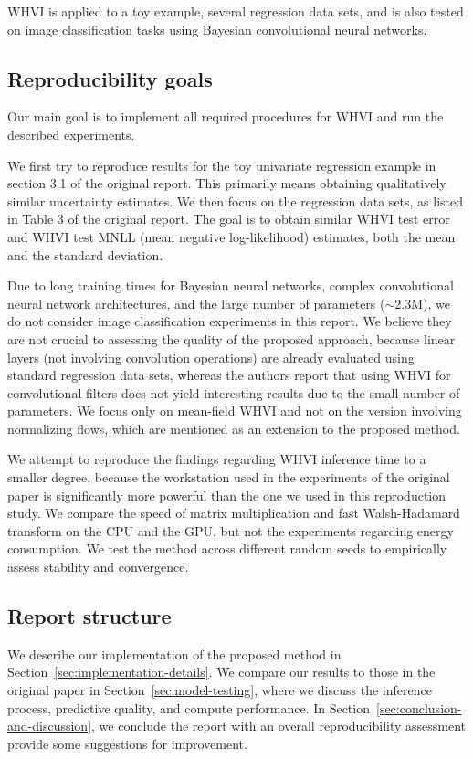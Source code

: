 WHVI is applied to a toy example, several regression data sets, and is also tested on image classification tasks using Bayesian convolutional neural networks.

\subsection{Reproducibility goals}\label{subsec:reproducibility-goals}
Our main goal is to implement all required procedures for WHVI and run the described experiments.

We first try to reproduce results for the toy univariate regression example in section 3.1 of the original report.
This primarily means obtaining qualitatively similar uncertainty estimates.
We then focus on the regression data sets, as listed in Table 3 of the original report.
The goal is to obtain similar WHVI test error and WHVI test MNLL (mean negative log-likelihood) estimates, both the mean and the standard deviation.

Due to long training times for Bayesian neural networks, complex convolutional neural network architectures, and the large number of parameters ($\sim 2.3$M), we do not consider image classification experiments in this report.
We believe they are not crucial to assessing the quality of the proposed approach, because linear layers (not involving convolution operations) are already evaluated using standard regression data sets, whereas the authors report that using WHVI for convolutional filters does not yield interesting results due to the small number of parameters.
We focus only on mean-field WHVI and not on the version involving normalizing flows, which are mentioned as an extension to the proposed method.

We attempt to reproduce the findings regarding WHVI inference time to a smaller degree, because the workstation used in the experiments of the original paper is significantly more powerful than the one we used in this reproduction study.
We compare the speed of matrix multiplication and fast Walsh-Hadamard transform on the CPU and the GPU, but not the experiments regarding energy consumption.
We test the method across different random seeds to empirically assess stability and convergence.

\subsection{Report structure}\label{subsec:report-structure}
We describe our implementation of the proposed method in Section~\ref{sec:implementation-details}.  %
We compare our results to those in the original paper in Section~\ref{sec:model-testing}, where we discuss the inference process, predictive quality, and compute performance.
In Section~\ref{sec:conclusion-and-discussion}, we conclude the report with an overall reproducibility assessment provide some suggestions for improvement.
